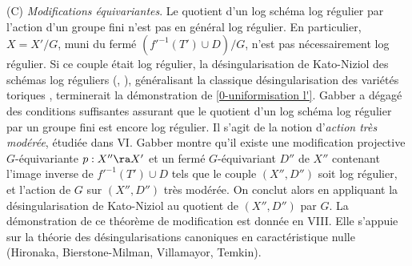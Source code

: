 \documentclass[10pt]{../fichiers-configuration-latex/smfart}
\begin{document}
(C) \textit{Modifications équivariantes}. Le quotient d'un log schéma log régulier par l'action d'un
groupe fini n'est pas en général log régulier. En particulier, $X = X'/G$, muni du fermé
$(f'^{-1}(T') \cup D)/G$, n'est pas nécessairement log régulier. Si ce couple était log régulier, la
désingularisation de Kato-Niziol des schémas log réguliers (\cite{Toric@Kato}, \cite{Toric@Niziol}),
généralisant la classique désingularisation des variétés toriques \cite{Toroidal@KKMS}, terminerait
la démonstration de \ref{0-uniformisation l'}. Gabber a dégagé des conditions suffisantes assurant
que le quotient d'un log schéma log régulier par un groupe fini est encore log régulier. Il s'agit
de la notion d'\textit{action très modérée}, étudiée dans VI.  Gabber montre qu'il existe une
modification projective $G$-équivariante $p : X'' \ra X'$ et un fermé $G$-équivariant $D''$ de $X''$
contenant l'image inverse de $f'^{-1}(T') \cup D$ tels que le couple $(X'',D'')$ soit log régulier,
et l'action de $G$ sur $(X'',D'')$ très modérée. On conclut alors en appliquant la désingularisation
de Kato-Niziol au quotient de $(X'',D'')$ par $G$. La démonstration de ce théorème de modification
est donnée en VIII. Elle s'appuie sur la théorie des désingularisations canoniques en
caractéristique nulle (Hironaka, Bierstone-Milman, Villamayor, Temkin). 
\end{document}
